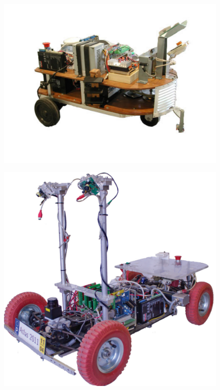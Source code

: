 \begin{figure}[!h]
	\centering
		\begin{minipage}[t]{0.32\textwidth}
			\includegraphics[width=\textwidth]{../figure/modelosatlas1.pdf}
			\label{fig:modelosatlas1}
		\end{minipage}
		\begin{minipage}[t]{0.32\textwidth}
			\includegraphics[width=\textwidth]{../figure/modelosatlas2.pdf}

\end{minipage}
\end{figure}
